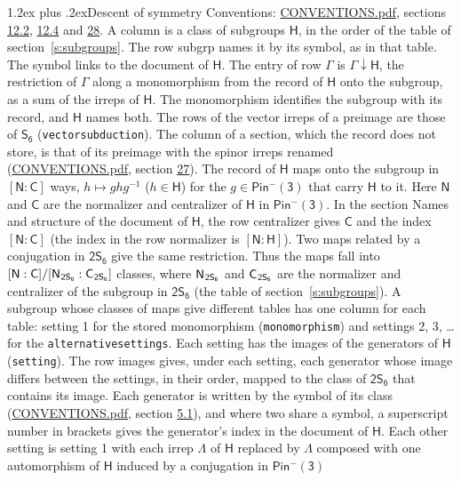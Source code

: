 \documentclass[10pt,a4paper]{article}
\makeatletter
\renewcommand\section{\@startsection{section}{1}{\z@}{-3ex plus -1ex minus -.2ex}%
  {1.2ex plus .2ex}{\normalfont\large\sffamily\bfseries\color{parttitle}}}
\numberwithin{equation}{section}
\newcommand{\grp}[1]{\mathsf{#1}}
\newcommand{\grpindex}[2]{[#1 : #2]}
\newcommand{\restr}[2]{#1\!\downarrow#2}
\newcommand{\hairsp}{\mkern1mu}
\makeatother
\begin{document}
\section{Descent of symmetry}\label{s:subduction}
Conventions: \href{../../CONVENTIONS.pdf}{CONVENTIONS.pdf}, sections \href{../../../rotation/CONVENTIONS.pdf\#conv.12.2}{12.2}, \href{../../../rotation/CONVENTIONS.pdf\#conv.12.4}{12.4} and \href{../../CONVENTIONS.pdf\#conv.28}{28}.
A column is a class of subgroups $\grp{H}$, in the order of the table of section~\ref{s:subgroups}. The row subgrp names it by its symbol, as in that table. The symbol links to the document of $\grp{H}$. The entry of row $\Gamma$ is $\restr{\Gamma}{\grp{H}}$, the restriction of $\Gamma$ along a monomorphism from the record of $\grp{H}$ onto the subgroup, as a sum of the irreps of $\grp{H}$. The monomorphism identifies the subgroup with its record, and $\grp{H}$ names both. The rows of the vector irreps of a preimage are those of \href{../../../rotation/data/pdf/S6.pdf}{$\grp{S_{6}}$} (\texttt{vectorsubduction}). The column of a section, which the record does not store, is that of its preimage with the spinor irreps renamed (\href{../../CONVENTIONS.pdf}{CONVENTIONS.pdf}, section \href{../../CONVENTIONS.pdf\#conv.27}{27}). \label{n:group.normalizer.o3}\label{n:group.centralizer.o3}\label{n:element.h}The record of $\grp{H}$ maps onto the subgroup in $\grpindex{\grp{N}}{\grp{C}}$ ways, $h \mapsto g h g^{-1}$ ($h \in \grp{H}$) for the $g \in \grp{Pin^{-}(3)}$ that carry $\grp{H}$ to it. Here $\grp{N}$ and $\grp{C}$ are the normalizer and centralizer of $\grp{H}$ in \href{Pinminus3.pdf}{$\grp{Pin^{-}(3)}$}. In the section Names and structure of the document of $\grp{H}$, the row centralizer gives $\grp{C}$ and the index $\grpindex{\grp{N}}{\grp{C}}$ (the index in the row normalizer is $\grpindex{\grp{N}}{\grp{H}}$). Two maps related by a conjugation in $\grp{2S_{6}}$ give the same restriction. Thus the maps fall into $\grpindex{\grp{N}}{\grp{C}}/\grpindex{\grp{N}_{\hairsp \grp{2S_{6}}}}{\grp{C}_{\hairsp \grp{2S_{6}}}}$ classes, where $\grp{N}_{\hairsp \grp{2S_{6}}}$ and $\grp{C}_{\hairsp \grp{2S_{6}}}$ are the normalizer and centralizer of the subgroup in $\grp{2S_{6}}$ (the table of section~\ref{s:subgroups}). \label{n:head.setting}A subgroup whose classes of maps give different tables has one column for each table: setting 1 for the stored monomorphism (\texttt{monomorphism}) and settings 2, 3, \dots{} for the \texttt{alternativesettings}. Each setting has the images of the generators of $\grp{H}$ (\texttt{setting}). \label{n:head.images}The row images gives, under each setting, each generator whose image differs between the settings, in their order, mapped to the class of $\grp{2S_{6}}$ that contains its image. Each generator is written by the symbol of its class (\href{../../CONVENTIONS.pdf}{CONVENTIONS.pdf}, section \href{../../../rotation/CONVENTIONS.pdf\#conv.5.1}{5.1}), and where two share a symbol, a superscript number in brackets gives the generator's index in the document of $\grp{H}$. \label{n:irrep.Delta}Each other setting is setting 1 with each irrep $\Lambda$ of $\grp{H}$ replaced by $\Lambda$ composed with one automorphism of $\grp{H}$ induced by a conjugation in \href{Pinminus3.pdf}{$\grp{Pin^{-}(3)}$} 
\end{document}
